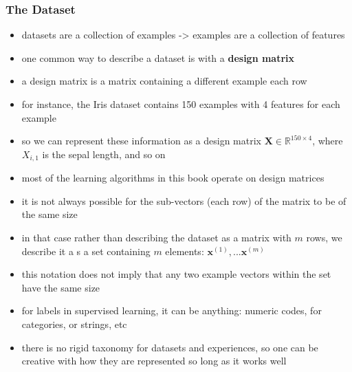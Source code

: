 \documentclass[11pt, twocolumn]{report}
\def\realnumbers{\mathbb{R}}
\begin{document}
\subsubsection{The Dataset}
\begin{itemize}
  \item datasets are a collection of examples -> examples are a collection of
    features
  \item one common way to describe a dataset is with a \textbf{design matrix}
  \item a design matrix is a matrix containing a different example each row
  \item for instance, the Iris dataset contains 150 examples with 4 features
    for each example
  \item so we can represent these information as a design matrix $\bm{X} \in
    \realnumbers^{150 \times 4}$, where $X_{i, 1}$ is the sepal length, and so
    on
  \item most of the learning algorithms in this book operate on design matrices
  \item it is not always possible for the sub-vectors (each row) of the matrix
    to be of the same size
  \item in that case rather than describing the dataset as a matrix with $m$
    rows, we describe it a s a set containing $m$ elements:
    ${\bm{x}^{(1)},...\bm{x}^{(m)}}$
  \item this notation does not imply that any two example vectors within the
    set have the same size
  \item for labels in supervised learning, it can be anything: numeric codes,
    for categories, or strings, etc
  \item there is no rigid taxonomy for datasets and experiences, so one can be
    creative with how they are represented so long as it works well
\end{itemize}
\end{document}
